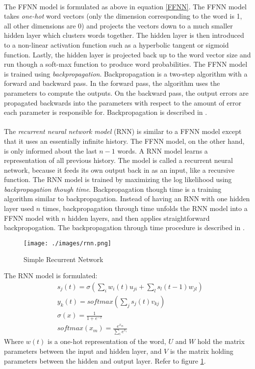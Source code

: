 \paragraph{}
The FFNN model is formulated as above in equation \ref{FFNN}. The FFNN model takes \emph{one-hot} word vectors (only the dimension corresponding to the word is 1, all other dimensions are 0) and projects the vectors down to a much smaller hidden layer which clusters words together. The hidden layer is then introduced to a non-linear activation function such as a hyperbolic tangent or sigmoid function. Lastly, the hidden layer is projected back up to the word vector size and run though a soft-max function to produce word probabilities. The FFNN model is trained using \emph{backpropagation}. Backpropagation is a two-step algorithm with a forward and backward pass. In the forward pass, the algorithm uses the parameters to compute the outputs. On the backward pass, the output errors are propagated backwards into the parameters with respect to the amount of error each parameter is responsible for. Backpropagation is described in \cite{Bengio2003}.

\paragraph{}
The \emph{recurrent neural network model} (RNN) is similar to a FFNN model except that it uses an essentially infinite history. The FFNN model, on the other hand, is only informed about the last $n-1$ words. A RNN model learns a representation of all previous history. The model is called a recurrent neural network, because it feeds its own output back in as an input, like a recursive function. The RNN model is trained by maximizing the log likelihood using \emph{backpropagation though time}. Backpropagation though time is a training algorithm similar to backpropagation. Instead of having an RNN with one hidden layer used $n$ times, backpropagation through time unfolds the RNN model into a FFNN model with $n$ hidden layers, and then applies straightforward backpropogation. The backpropagation through time procedure is described in \cite{Mikolov2012}.

\begin{figure}
\centering
\texttt{[image: ./images/rnn.png]}
\caption{Simple Recurrent Network \cite[pg. 34]{Mikolov2012}}
\label{fig:RNNfigure}
\end{figure}

The RNN model is formulated:
\begin{align}
&s_j(t) = \sigma \left( \sum_i w_i(t) u_{ji} + \sum_l s_l (t-1) w_{jl} \right)
\\
&y_k(t) = softmax \left( \sum_j s_j(t) v_{kj} \right)
\\ 
&\sigma(x) = \frac{1}{1+e^{-x}} \nonumber
\\ 
&softmax(x_m) = \frac{e^{x_m} }{ \sum_i e^{x_i} }  \nonumber
\end{align}
Where $w(t)$ is a one-hot representation of the word, $U$ and $W$ hold the matrix parameters between the input and hidden layer, and $V$ is the matrix holding parameters between the hidden and output layer. Refer to figure \ref{fig:RNNfigure}.

